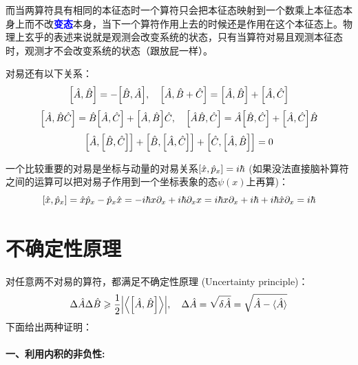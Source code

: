 而当两算符具有相同的本征态时一个算符只会把本征态映射到一个数乘上本征态本身上而不改\textcolor{blue}{\textbf{变态}}本身，当下一个算符作用上去的时候还是作用在这个本征态上。物理上玄乎的表述来说就是观测会改变系统的状态，只有当算符对易且观测本征态时，观测才不会改变系统的状态（跟放屁一样）。

对易还有以下关系：
\[\comm{\hat{A}}{\hat{B}}=-\comm{\hat{B}}{\hat{A}}, \quad \comm{\hat{A}}{\hat{B}+\hat{C}}=\comm{\hat{A}}{\hat{B}}+\comm{\hat{A}}{\hat{C}}\]
\[\comm{\hat{A}}{\hat{B}\hat{C}}=\hat{B}\comm{\hat{A}}{\hat{C}}+\comm{\hat{A}}{\hat{B}}\hat{C}, \quad \comm{\hat{A}\hat{B}}{\hat{C}}=\hat{A}\comm{\hat{B}}{\hat{C}}+\comm{\hat{A}}{\hat{C}}\hat{B}\]
\[\comm{\hat{A}}{\comm{\hat{B}}{\hat{C}}}+\comm{\hat{B}}{\comm{\hat{A}}{\hat{C}}}+\comm{\hat{C}}{\comm{\hat{A}}{\hat{B}}}=0\]

一个比较重要的对易是坐标与动量的对易关系$\comm{\hat{x}}{\hat{p}_x}=i\hbar$ (如果没法直接脑补算符之间的运算可以把对易子作用到一个坐标表象的态$\psi(x)$上再算)：
\[\comm{\hat{x}}{\hat{p}_x}=\hat{x}\hat{p}_x-\hat{p}_x\hat{x}=-i\hbar x\partial_x+i\hbar\partial_xx=i\hbar x\partial_x+i\hbar+i\hbar\hat{x}\partial_x=i\hbar\]

\section{不确定性原理}
对任意两不对易的算符，都满足不确定性原理 (Uncertainty principle)：
\[\Delta \hat{A}\Delta \hat{B} \geqslant \frac{1}{2}\qty|\left \langle \comm{\hat{A}}{\hat{B}} \right \rangle|, \quad \Delta\hat{A}=\sqrt{\delta\hat{A}}=\sqrt{\hat{A}-\langle \hat{A} \rangle}\]
下面给出两种证明：

\paragraph*{一、利用内积的非负性:}

